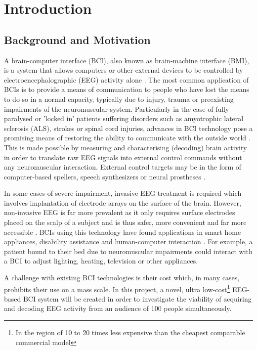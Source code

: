 \chapter{Introduction}
\label{chapter:introduction}

\graphicspath{ {report/Chapter1/assets/} } 

\section{Background and Motivation}

A brain-computer interface (BCI), also known as brain-machine interface (BMI), is a system that allows computers or other external devices to be controlled by electroencephalographic (EEG) activity alone \cite{bci-survey-nicolas-alonso}. The most common application of BCIs is to provide a means of communication to people who have lost the means to do so in a normal capacity, typically due to injury, trauma or preexisting impairments of the neuromuscular system. Particularly in the case of fully paralysed or 'locked in' patients suffering disorders such as amyotrophic lateral sclerosis (ALS), strokes or spinal cord injuries, advances in BCI technology pose a promising means of restoring the ability to communicate with the outside world \cite{bci-wolpaw}. This is made possible by measuring and characterising (decoding) brain activity in order to translate raw EEG signals into external control commands without any neuromuscular interaction. External control targets may be in the form of computer-based spellers, speech synthesizers or neural prostheses \cite{bci-survey-nicolas-alonso}. 

In some cases of severe impairment, invasive EEG treatment is required which involves implantation of electrode arrays on the surface of the brain. However, non-invasive EEG is far more prevalent as it only requires surface electrodes placed on the scalp of a subject and is thus safer, more convenient and far more accessible \cite{duart-comparing-ssvep-stimuli}. BCIs using this technology have found applications in smart home appliances, disability assistance and human-computer interaction \cite{zhao-stimulus-layout-effect}. For example, a patient bound to their bed due to neuromuscular impairments could interact with a BCI to adjust lighting, heating, television or other appliances. 

A challenge with existing BCI technologies is their cost which, in many cases, prohibits their use on a mass scale. In this project, a novel, ultra low-cost\footnote{In the region of 10 to 20 times less expensive than the cheapest comparable commercial model} EEG-based BCI system will be created in order to investigate the viability of acquiring and decoding EEG activity from an audience of 100 people simultaneously. 

